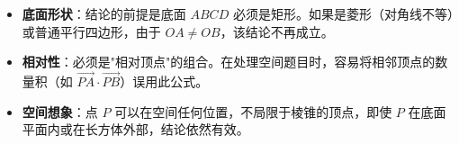 \begin{trapbox}
\begin{itemize}
    \item \textbf{底面形状}：结论的前提是底面 $ABCD$ 必须是矩形。如果是菱形（对角线不等）或普通平行四边形，由于 $OA \neq OB$，该结论不再成立。
    \item \textbf{相对性}：必须是"相对顶点"的组合。在处理空间题目时，容易将相邻顶点的数量积（如 $\vec{PA} \cdot \vec{PB}$）误用此公式。
    \item \textbf{空间想象}：点 $P$ 可以在空间任何位置，不局限于棱锥的顶点，即使 $P$ 在底面平面内或在长方体外部，结论依然有效。
\end{itemize}
\end{trapbox}